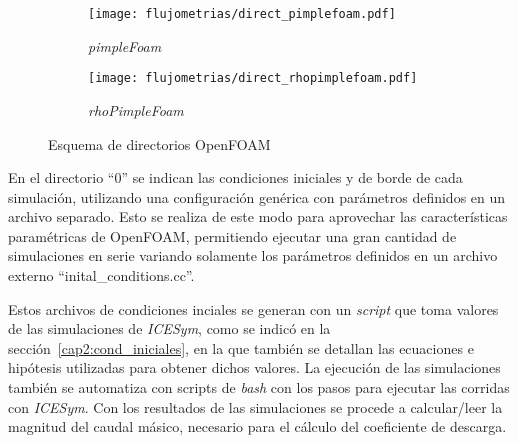 \begin{figure}[ht!]
  \centering
  \begin{subfigure}[b]{0.4\textwidth}
    \centering
    \texttt{[image: flujometrias/direct\_pimplefoam.pdf]}
    \caption{\emph{pimpleFoam}\label{fig:direc_pf} }
  \end{subfigure}%
  \begin{subfigure}[b]{0.4\textwidth}
    \centering
    \texttt{[image: flujometrias/direct\_rhopimplefoam.pdf]}
    \caption{\emph{rhoPimpleFoam}\label{fig:direc_rpf} }
  \end{subfigure}
  \caption{Esquema de directorios OpenFOAM}
\end{figure}


En el directorio ``0'' se indican las condiciones iniciales y de borde de cada
simulación, utilizando una configuración genérica con parámetros definidos en un
archivo separado.
%
Esto se realiza de este modo para aprovechar las características paramétricas de
OpenFOAM, permitiendo ejecutar una gran cantidad de simulaciones en serie
variando solamente los parámetros definidos en un archivo externo
``inital\_conditions.cc''.

Estos archivos de condiciones inciales se generan con un \emph{script} que toma
valores de las simulaciones de \emph{ICESym}, como se indicó en la
sección~\ref{cap2:cond_iniciales}, en la que también se detallan las ecuaciones
e hipótesis utilizadas para obtener dichos valores.
%
La ejecución de las simulaciones también se automatiza con scripts de
\emph{bash} con los pasos para ejecutar las corridas con \emph{ICESym}.
%
Con los resultados de las simulaciones se procede a calcular/leer la magnitud
del caudal másico, necesario para el cálculo del coeficiente de descarga.




